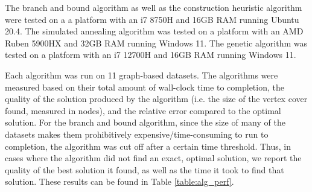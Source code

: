 \documentclass[acmlarge]{acmart}
\begin{document}

The branch and bound algorithm as well as the construction heuristic algorithm were tested on a a platform with an i7 8750H and 16GB RAM running Ubuntu 20.4. The simulated annealing algorithm was tested on a platform with an AMD Ruben 5900HX and 32GB RAM running Windows 11. The genetic algorithm was tested on a platform with an i7 12700H and 16GB RAM running Windows 11.

Each algorithm was run on 11 graph-based datasets. The algorithms were measured based on their total amount of wall-clock time to completion, the quality of the solution produced by the algorithm (i.e. the size of the vertex cover found, measured in nodes), and the relative error compared to the optimal solution. For the branch and bound algorithm, since the size of many of the datasets makes them prohibitively expensive/time-consuming to run to completion, the algorithm was cut off after a certain time threshold. Thus, in cases where the algorithm did not find an exact, optimal solution, we report the quality of the best solution it found, as well as the time it took to find that solution. These results can be found in Table \ref{table:alg_perf}.
\end{document}
